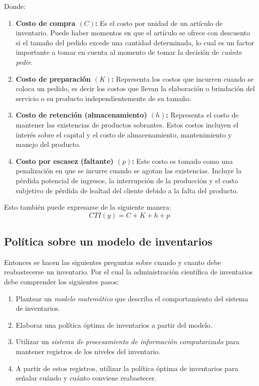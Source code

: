 Donde:

\begin{enumerate}
	\item \textbf{Costo de compra $(C)$: }Es el costo por unidad de un artículo de inventario. Puede haber momentos en que el artículo se ofrece con descuento si el tamaño del pedido excede una cantidad determinada, lo cual es un factor importante a tomar en cuenta al momento de tomar la decisión de \textsl{cuánto pedir}.

	\item \textbf{Costo de preparación $(K)$: }Representa los costos que incurren cuando se coloca un pedido, es decir los costos que llevan la elaboración o brindación del servicio o su producto independientemente de su tamaño.

	\item \textbf{Costo de retención (almacenamiento) $(h)$: }Representa el costo de mantener las existencias de productos sobrantes. Estos costos incluyen el interés sobre el capital y el costo de almacenamiento, mantenimiento y manejo del producto.

	\item \textbf{Costo por escasez (faltante) $(p)$: }Este costo es tomado como una penalización en que se incurre cuando se agotan las existencias. Incluye la pérdida potencial de ingresos, la interrupción de la producción y el costo subjetivo de pérdida de lealtad del cliente debido a la falta del producto.
\end{enumerate}

Esto también puede expresarse de la siguiente manera:
\begin{equation}
	\label{2.1}
	CTI(y) = C + K + h + p
\end{equation}

\subsection{Política sobre un modelo de inventarios}

Entonces se hacen las siguientes preguntas sobre cuando y cuanto debe reabastecerse un inventario. Por el cual la administración científica de inventarios debe comprender los siguientes pasos:
\begin{enumerate}
	\item Plantear un \textsl{modelo matemático} que describa el comportamiento del sistema de inventarios.
	\item Elaborar una política óptima de inventarios a partir del modelo.
	\item Utilizar un \textsl{sistema de procesamiento de información computarizado} para mantener registros de los niveles del inventario.
	\item A partir de estos registros, utilizar la política óptima de inventarios para señalar cuándo y cuánto conviene reabastecer. 
\end{enumerate}

